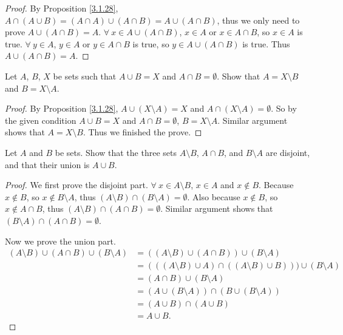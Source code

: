 \begin{proof}
By Proposition \ref{3.1.28}, \(A \cap (A \cup B) = (A \cap A) \cup (A \cap B) = A \cup (A \cap B)\), thus we only need to prove \(A \cup (A \cap B) = A\).
\(\forall\ x \in A \cup (A \cap B)\), \(x \in A\) or \(x \in A \cap B\), so \(x \in A\) is true.
\(\forall\ y \in A\), \(y \in A\) or \(y \in A \cap B\) is true, so \(y \in A \cup (A \cap B)\) is true.
Thus \(A \cup (A \cap B) = A\).
\end{proof}

\begin{exercise}\label{ex 3.1.9}
Let \(A\), \(B\), \(X\) be sets such that \(A \cup B = X\) and \(A \cap B = \emptyset\).
Show that \(A = X \setminus B\) and \(B = X \setminus A\).
\end{exercise}

\begin{proof}
By Proposition \ref{3.1.28}, \(A \cup (X \setminus A) = X\) and \(A \cap (X \setminus A) = \emptyset\).
So by the given condition \(A \cup B = X\) and \(A \cap B = \emptyset\), \(B = X \setminus A\).
Similar argument shows that \(A = X \setminus B\).
Thus we finished the prove.
\end{proof}

\begin{exercise}\label{ex 3.1.10}
Let \(A\) and \(B\) be sets.
Show that the three sets \(A \setminus B\), \(A \cap B\), and \(B \setminus A\) are disjoint, and that their union is \(A \cup B\).
\end{exercise}

\begin{proof}
We first prove the disjoint part.
\(\forall\ x \in A \setminus B\), \(x \in A\) and \(x \notin B\).
Because \(x \notin B\), so \(x \notin B \setminus A\), thus \((A \setminus B) \cap (B \setminus A) = \emptyset\).
Also because \(x \notin B\), so \(x \notin A \cap B\), thus \((A \setminus B) \cap (A \cap B) = \emptyset\).
Similar argument shows that \((B \setminus A) \cap (A \cap B) = \emptyset\).

Now we prove the union part.
\begin{align*}
    (A \setminus B) \cup (A \cap B) \cup (B \setminus A)
    &= ((A \setminus B) \cup (A \cap B)) \cup (B \setminus A) \\
    &= (((A \setminus B) \cup A) \cap ((A \setminus B) \cup B))) \cup (B \setminus A) \\
    &= (A \cap B) \cup (B \setminus A) \\
    &= (A \cup (B \setminus A)) \cap (B \cup (B \setminus A)) \\
    &= (A \cup B) \cap (A \cup B) \\
    &= A \cup B.
\end{align*}
\end{proof}

